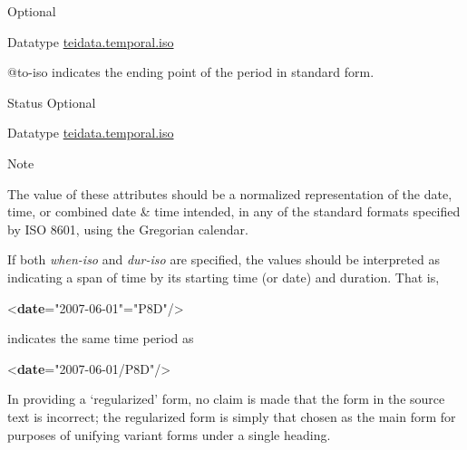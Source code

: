 \begin{reflist}
\begin{sansreflist}
\begin{reflist}
  Optional
    \item[{Datatype}]
  \hyperref[TEI.teidata.temporal.iso]{teidata.temporal.iso}
\end{reflist}  
    \item[@to-iso]
  indicates the ending point of the period in standard form.
\begin{reflist}
    \item[{Status}]
  Optional
    \item[{Datatype}]
  \hyperref[TEI.teidata.temporal.iso]{teidata.temporal.iso}
\end{reflist}  
\end{sansreflist}  
    \item[{Note}]
  \par
The value of these attributes should be a normalized representation of the date, time, or combined date \& time intended, in any of the standard formats specified by ISO 8601, using the Gregorian calendar.\par
If both {\itshape when-iso} and {\itshape dur-iso} are specified, the values should be interpreted as indicating a span of time by its starting time (or date) and duration. That is, \par\bgroup{}\exampleFont \begin{shaded}\noindent\mbox{}{<\textbf{date}\hspace*{1em}{when-iso}="{2007-06-01}"\hspace*{1em}{dur-iso}="{P8D}"/>}\end{shaded}\egroup\par \noindent  indicates the same time period as \par\bgroup{}\exampleFont \begin{shaded}\noindent\mbox{}{<\textbf{date}\hspace*{1em}{when-iso}="{2007-06-01/P8D}"/>}\end{shaded}\egroup\par \par
In providing a ‘regularized’ form, no claim is made that the form in the source text is incorrect; the regularized form is simply that chosen as the main form for purposes of unifying variant forms under a single heading.
\end{reflist}  
